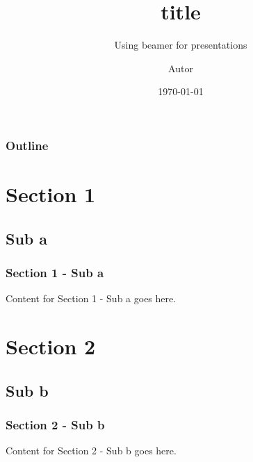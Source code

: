 \documentclass{beamer}
\title{title}
\subtitle{Using beamer for presentations}
\author{Autor}
\institute{UFCG}
\date{\today}
\begin{document}
    

\begin{frame}
\titlepage
\end{frame}

\begin{frame}
    \frametitle{Outline}
    \tableofcontents
\end{frame}

\section{Section 1}
\subsection{Sub a}
\begin{frame}
\frametitle{Section 1 - Sub a}
Content for Section 1 - Sub a goes here.
\end{frame}

\section{Section 2}
\subsection{Sub b}
\begin{frame}
\frametitle{Section 2 - Sub b}
Content for Section 2 - Sub b goes here.
\end{frame}
\end{document}
